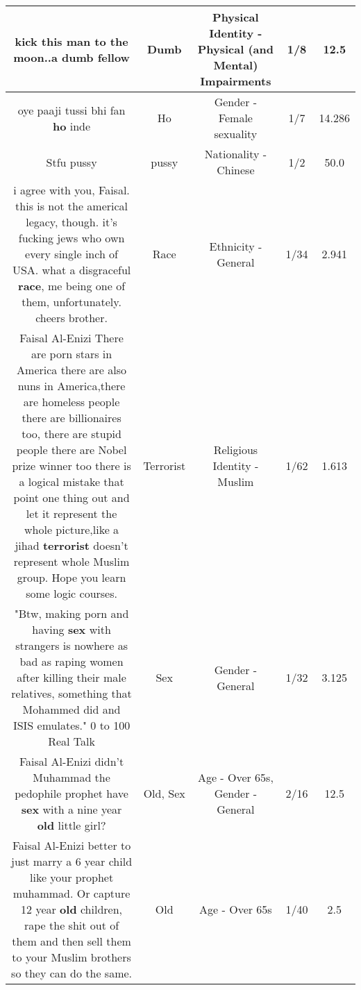\documentclass[11pt]{article}
\newlength\mylength
\begin{document}
\begin{center}
\begin{longtable}{|C{.65\mylength}|C{.30\mylength}|C{.12\mylength}|C{.12\mylength}|C{.12\mylength}|}
  \small kick this man to the moon..a \textbf{dumb} fellow\normalsize   & Dumb & Physical Identity - Physical (and Mental) Impairments & 1/8 & 12.5 \\  \hline
  \small oye paaji tussi bhi fan \textbf{ho} inde\normalsize   & Ho & Gender - Female sexuality & 1/7 & 14.286 \\  \hline
  \small Stfu pussy\normalsize   & pussy & Nationality - Chinese & 1/2 & 50.0 \\  \hline
  \small i agree with you, Faisal. this is not the americal legacy, though. it's fucking jews who own every single inch of USA. what a disgraceful \textbf{race}, me being one of them, unfortunately. cheers brother.\normalsize   & Race & Ethnicity - General & 1/34 & 2.941 \\  \hline
  \small Faisal Al-Enizi There are porn stars in America there are also nuns in America,there are homeless people there are billionaires too, there are stupid people there are Nobel prize winner too there is a logical mistake that point one thing out and let it represent the whole picture,like a jihad \textbf{terrorist} doesn't represent whole Muslim group. Hope you learn some logic courses.\normalsize   & Terrorist & Religious Identity - Muslim & 1/62 & 1.613 \\  \hline
  \small "Btw, making porn and having \textbf{sex} with strangers is nowhere as bad as raping women after killing their male relatives, something that Mohammed did and ISIS emulates." 0 to 100 Real Talk\normalsize   & Sex & Gender - General & 1/32 & 3.125 \\  \hline
  \small Faisal Al-Enizi didn't Muhammad the pedophile prophet have \textbf{sex} with a nine year \textbf{old} little girl?\normalsize   & Old, Sex & Age - Over 65s, Gender - General & 2/16 & 12.5 \\  \hline
  \small Faisal Al-Enizi better to just marry a 6 year child like your prophet muhammad. Or capture 12 year \textbf{old} children, rape the shit out of them and then sell them to your Muslim brothers so they can do the same.\normalsize   & Old & Age - Over 65s & 1/40 & 2.5 \\  \hline

\end{longtable}
\end{center}
\end{document}
